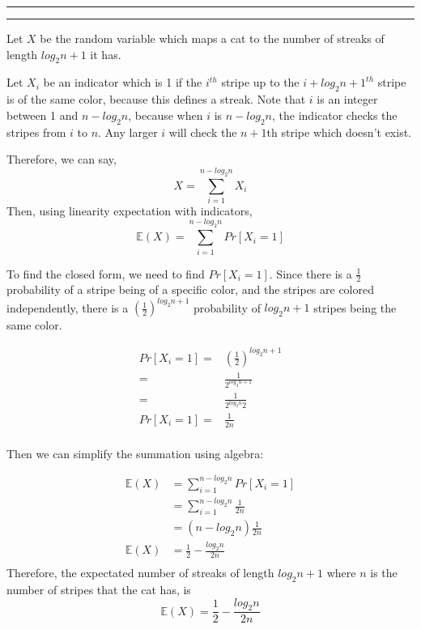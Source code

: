 \documentclass[11pt]{article}
\newcounter{questionCounter}
\newcounter{partCounter}[questionCounter]
\newenvironment{question}[2][\arabic{questionCounter}]{%
    \setcounter{partCounter}{0}%
    \vspace{.25in} \hrule \vspace{0.5em}%
        \noindent{\bf #2}%
    \vspace{0.8em} \hrule \vspace{.10in}%
    \addtocounter{questionCounter}{1}%
}{}
\begin{document}
\begin{question}{Never Trust a Talking Cat}
Let $X$ be the random variable which maps a cat to the number of streaks of length
$log_2n+1$ it has.

Let $X_i$ be an indicator which is 1 if the $i^{th}$ stripe up to the $i+log_2n+1^{th}$
stripe is of the same color, because this defines a streak. Note that $i$ is an integer 
between 1 and $n-log_2n$, because when $i$ is $n-log_2n$, the indicator checks the stripes
from $i$ to $n$. Any larger $i$ will check the $n+1$th stripe which doesn't exist.

Therefore, we can say,
$$X = \sum_{i=1}^{n-log_2n}{X_i}$$
Then, using linearity expectation with indicators,
$$ \mathbb{E}(X) = \sum_{i=1}^{n-log_2n}{Pr[X_i=1]} $$

To find the closed form, we need to find $Pr[X_i=1]$. Since there is a $\frac{1}{2}$
probability of a stripe being of a specific color, and the stripes are colored
independently, there is a $(\frac{1}{2})^{log_{2}n+1}$
probability of $log_{2}n+1$ stripes being the same color.

\begin{align*}
Pr[X_i=1]=&(\frac{1}{2})^{log_{2}n+1}\\
=&\frac{1}{2^{log_{2}n+1}}\\
=&\frac{1}{2^{log_{2}n}2}\\
Pr[X_i=1]=&\frac{1}{2n}\\
\end{align*}

Then we can simplify the summation using algebra:

\begin{align*}
\mathbb{E}(X) &= \sum_{i=1}^{n-log_2n}{Pr[X_i=1]}\\
              &= \sum_{i=1}^{n-log_2n}{\frac{1}{2n}}\\
              &= (n-log_2n)\frac{1}{2n}\\
\mathbb{E}(X) &= \frac{1}{2}-\frac{log_2n}{2n}\\
\end{align*}
Therefore, the expectated number of streaks of length $log_2n+1$ 
where $n$ is the number of stripes that the cat has, is
$$\mathbb{E}(X) = \frac{1}{2}-\frac{log_2n}{2n}$$
\end{question}
\end{document}
